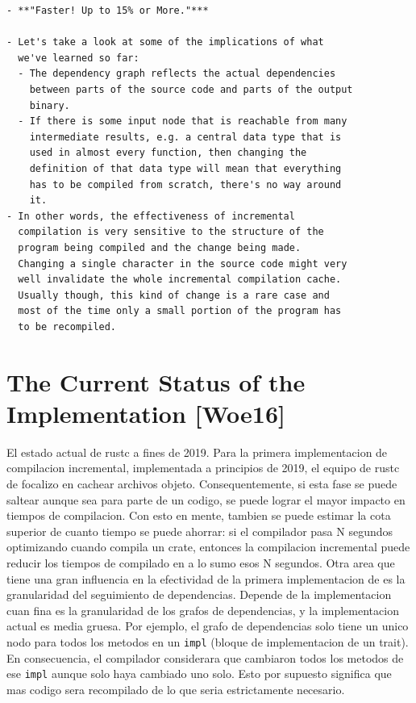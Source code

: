 \documentclass[12pt, a4paper]{report}
\begin{document}
\begin{verbatim}
- **"Faster! Up to 15% or More."***

- Let's take a look at some of the implications of what
  we've learned so far:
  - The dependency graph reflects the actual dependencies
    between parts of the source code and parts of the output
    binary.
  - If there is some input node that is reachable from many
    intermediate results, e.g. a central data type that is
    used in almost every function, then changing the
    definition of that data type will mean that everything
    has to be compiled from scratch, there's no way around
    it.
- In other words, the effectiveness of incremental
  compilation is very sensitive to the structure of the
  program being compiled and the change being made.
  Changing a single character in the source code might very
  well invalidate the whole incremental compilation cache.
  Usually though, this kind of change is a rare case and
  most of the time only a small portion of the program has
  to be recompiled.
\end{verbatim}
\cite{rust_blog_incremental_compilation}

\section*{The Current Status of the Implementation [Woe16]}

El estado actual de rustc a fines de 2019.
Para la primera implementacion de compilacion incremental, implementada a principios de 2019, el equipo de rustc de focalizo en cachear archivos objeto.
Consequentemente, si esta fase se puede saltear aunque sea para parte de un codigo, se puede lograr el mayor impacto en tiempos de compilacion.
Con esto en mente, tambien se puede estimar la cota superior de cuanto tiempo se puede ahorrar: si el compilador pasa N segundos optimizando cuando compila un crate, entonces la compilacion incremental puede reducir los tiempos de compilado en a lo sumo esos N segundos.
Otra area que tiene una gran influencia en la efectividad de la primera implementacion de es la granularidad del seguimiento de dependencias.
Depende de la implementacion cuan fina es la granularidad de los grafos de dependencias, y la implementacion actual es media gruesa.
Por ejemplo, el grafo de dependencias solo tiene un unico nodo para todos los metodos en un \texttt{impl} (bloque de implementacion de un trait).
En consecuencia, el compilador considerara que cambiaron todos los metodos de ese \texttt{impl} aunque solo haya cambiado uno solo.
Esto por supuesto significa que mas codigo sera recompilado de lo que seria estrictamente necesario.
\cite{rust_blog_incremental_compilation}
\end{document}
